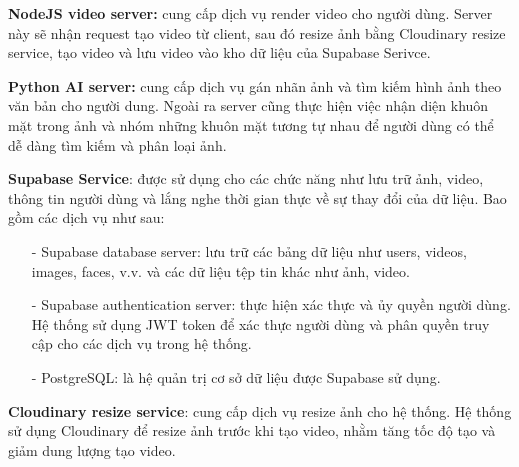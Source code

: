 \textbf{NodeJS video server:} cung cấp dịch vụ render video cho người dùng. Server này sẽ nhận request tạo video từ client, sau đó resize ảnh bằng Cloudinary resize service, tạo video và lưu video vào kho dữ liệu của Supabase Serivce. 

\textbf{Python AI server:} cung cấp dịch vụ gán nhãn ảnh và tìm kiếm hình ảnh theo văn bản cho người dung. Ngoài ra server cũng thực hiện việc nhận diện khuôn mặt trong ảnh và nhóm những khuôn mặt tương tự nhau để người dùng có thể dễ dàng tìm kiếm và phân loại ảnh. 

\textbf{Supabase Service}: được sử dụng cho các chức năng như lưu trữ ảnh, video, thông tin người dùng và lắng nghe thời gian thực về sự thay đổi của dữ liệu. Bao gồm các dịch vụ như sau:
\begin{itemize}
    \item[-] Supabase database server: lưu trữ các bảng dữ liệu như users, videos, images, faces, v.v. và các dữ liệu tệp tin khác như ảnh, video.
    \item[-] Supabase authentication server: thực hiện xác thực và ủy quyền người dùng. Hệ thống sử dụng JWT token để xác thực người dùng và phân quyền truy cập cho các dịch vụ trong hệ thống.
    \item[-] PostgreSQL: là hệ quản trị cơ sở dữ liệu được Supabase sử dụng.  
\end{itemize}

\textbf{Cloudinary resize service}: cung cấp dịch vụ resize ảnh cho hệ thống. Hệ thống sử dụng Cloudinary để resize ảnh trước khi tạo video, nhằm tăng tốc độ tạo và giảm dung lượng tạo video.

